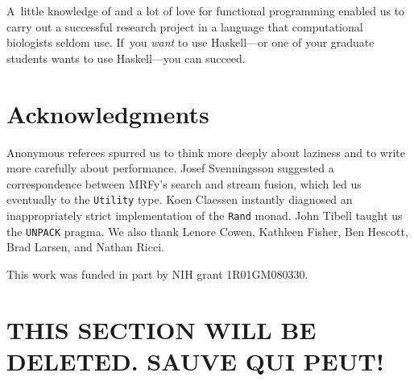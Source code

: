 \documentclass[]{jfp1}
\newcommand\mrfy{MRFy} %
\begin{document}
A~little knowledge of and a lot of love for functional programming
enabled us to carry out a successful research project in a language
that computational biologists seldom use.
If~you \emph{want} to use Haskell---or one of your graduate students
wants to use Haskell---you can
succeed. 




%  

 

\section*{Acknowledgments}

Anonymous referees spurred us to think
more deeply about laziness and to write more carefully about performance.
Josef Svenningsson suggested a correspondence between \mrfy's search
and stream fusion, which led us eventually to the \texttt{Utility} type.
Koen Claessen instantly diagnosed an inappropriately strict
implementation of the \texttt{Rand} monad.
John Tibell taught us the \texttt{UNPACK} pragma.
We also thank Lenore Cowen, Kathleen Fisher, Ben Hescott, Brad
Larsen, and Nathan Ricci.

This work was funded in part by NIH grant 1R01GM080330.


\section{THIS SECTION WILL BE DELETED.  SAUVE QUI PEUT!}











\end{document}
